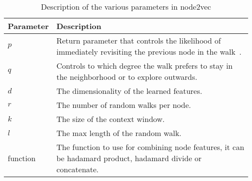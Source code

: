 
\begin{table}[tbp]
\centering
\begin{tabular}{@{}lp{}@{}}
\toprule
\textbf{Parameter} & \textbf{Description} \\
\midrule
$p$          &   Return parameter that controls the likelihood of immediately revisiting the previous node in the walk~\cite{node2vec}.   \\
$q$          &   Controls to which degree the walk prefers to stay in the neighborhood or to explore outwards.   \\
$d$          &   The dimensionality of the learned features.   \\
$r$          &   The number of random walks per node.   \\
$k$          &   The size of the context window.   \\
$l$          &   The max length of the random walk.   \\
function     &   The function to use for combining node features, it can be hadamard product, hadamard divide or concatenate.   \\
\bottomrule
\end{tabular}
\caption[Description of parameters in node2vec]{Description of the various parameters in node2vec}%
\label{tab:node2vecparams}
\end{table}




